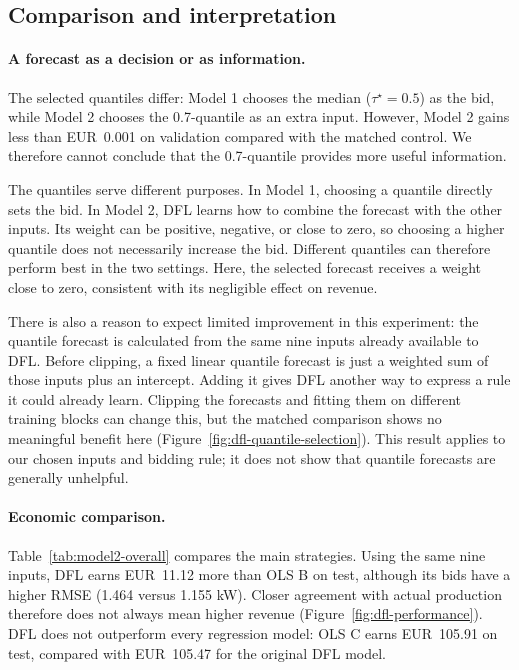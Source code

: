 \subsection{Comparison and interpretation}
\label{sec:model2-comparison}

\paragraph{A forecast as a decision or as information.}
The selected quantiles differ: Model 1 chooses the median
($\tau^\star=0.5$) as the bid, while Model 2 chooses the 0.7-quantile
as an extra input. However, Model 2 gains less than EUR~0.001 on
validation compared with the matched control. We therefore cannot
conclude that the 0.7-quantile provides more useful information.

The quantiles serve different purposes. In Model 1, choosing a quantile
directly sets the bid. In Model 2, DFL learns how to combine the forecast
with the other inputs. Its weight can be positive, negative, or close to
zero, so choosing a higher quantile does not necessarily increase the
bid. Different quantiles can therefore perform best in the two settings.
Here, the selected forecast receives a weight close to zero, consistent
with its negligible effect on revenue.

There is also a reason to expect limited improvement in this experiment:
the quantile forecast is calculated from the same nine inputs already
available to DFL. Before clipping, a fixed linear quantile forecast is
just a weighted sum of those inputs plus an intercept. Adding it gives
DFL another way to express a rule it could already learn. Clipping the
forecasts and fitting them on different training blocks can change this,
but the matched comparison shows no meaningful benefit here
(Figure~\ref{fig:dfl-quantile-selection}). This result applies to our
chosen inputs and bidding rule; it does not show that quantile forecasts
are generally unhelpful.

\paragraph{Economic comparison.}
Table~\ref{tab:model2-overall} compares the main strategies. Using the
same nine inputs, DFL earns EUR~11.12 more than OLS B on test, although
its bids have a higher RMSE (1.464 versus 1.155 kW). Closer agreement
with actual production therefore does not always mean higher revenue
(Figure~\ref{fig:dfl-performance}). DFL does not outperform every
regression model: OLS C earns EUR~105.91 on test, compared with
EUR~105.47 for the original DFL model.

